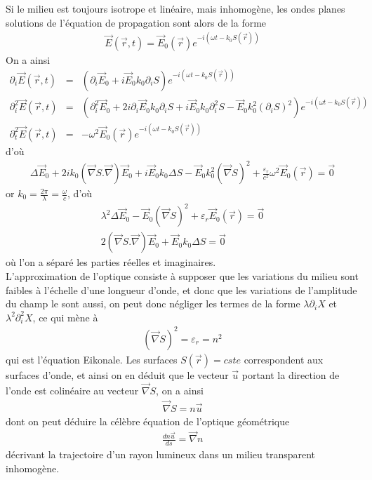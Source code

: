 \documentclass[12pt,prb,aps,epsf]{report}
\begin{document}
Si le milieu est toujours isotrope et linéaire, mais inhomogène, les ondes planes solutions de l'équation de propagation sont alors de la forme 
\begin{eqnarray}
\vec{E}(\vec{r},t) = \vec{E}_0(\vec{r}) e^{-i(\omega t - k_0 S(\vec{r}))}
\end{eqnarray}
On a ainsi
\begin{eqnarray}
\partial_i \vec{E}(\vec{r},t) &=& (\partial_i \vec{E}_0 +i \vec{E}_0 k_0\partial_i S)e^{-i(\omega t - k_0 S(\vec{r}))}\\
\partial_i^2 \vec{E}(\vec{r},t) &=& (\partial_i^2 \vec{E}_0 + 2i\partial_i\vec{E}_0 k_0\partial_i S +i \vec{E}_0 k_0\partial_i^2 S - \vec{E}_0 k_0^2(\partial_i S)^2)e^{-i(\omega t - k_0 S(\vec{r}))}\\
\partial_t^2 \vec{E}(\vec{r},t) &=& -\omega^2 \vec{E}_0(\vec{r}) e^{-i(\omega t - k_0 S(\vec{r}))}
\end{eqnarray}
d'où 
\begin{eqnarray}
\Delta \vec{E}_0 + 2i k_0 (\vec{\nabla}S.\vec{\nabla})\vec{E}_0 +i \vec{E}_0 k_0 \Delta S - \vec{E}_0 k_0^2(\vec{\nabla} S)^2  + \frac{\varepsilon_r}{c^2} \omega^2 \vec{E}_0(\vec{r}) = \vec{0}
\end{eqnarray}
or $k_0 = \frac{2\pi}{\lambda} = \frac {\omega}{c}$, d'où
\begin{eqnarray}
\lambda^2 \Delta \vec{E}_0 - \vec{E}_0 (\vec{\nabla} S)^2  + \varepsilon_r\vec{E}_0(\vec{r}) = \vec{0}\\
2 (\vec{\nabla}S.\vec{\nabla})\vec{E}_0 + \vec{E}_0 k_0 \Delta S = \vec{0}
\end{eqnarray}
où l'on a séparé les parties réelles et imaginaires.\\
L'approximation de l'optique consiste à supposer que les variations du milieu sont faibles à l'échelle d'une longueur d'onde, et donc que les variations de l'amplitude du champ le sont aussi, on peut donc négliger les termes de la forme $\lambda \partial_i X$ et $\lambda^2 \partial_i^2 X$, ce qui mène à 
\begin{eqnarray}
(\vec{\nabla} S)^2 = \varepsilon_r = n^2
\end{eqnarray}
qui est l'équation Eikonale. Les surfaces $S(\vec{r}) = cste$ correspondent aux surfaces d'onde, et ainsi on en déduit que le vecteur $\vec{u}$ portant la direction de l'onde est colinéaire au vecteur $\vec{\nabla}S$, on a ainsi 
\begin{eqnarray}
\vec{\nabla}S = n\vec{u}
\end{eqnarray} 
dont on peut déduire la célèbre équation de l'optique géométrique 
\begin{eqnarray}
\frac{dn\vec{u}}{ds} = \vec{\nabla}n
\end{eqnarray}
décrivant la trajectoire d'un rayon lumineux dans un milieu transparent inhomogène.
\end{document}
